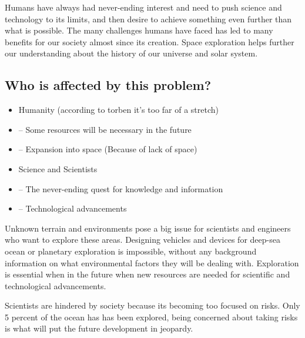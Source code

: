 Humans have always had never-ending interest and need to push science and technology to its limits, and then desire to achieve something even further than what is possible.  The many challenges humans have faced has led to many benefits for our society almost since its creation. Space exploration helps further our understanding about the history of our universe and solar system. %

\subsection{Who is affected by this problem?}
\begin{itemize}
	\item Humanity (according to torben it's too far of a stretch)
	\item -- Some resources will be necessary in the future
	\item -- Expansion into space (Because of lack of space)
	\item Science and Scientists
	\item -- The never-ending quest for knowledge and information
	\item -- Technological advancements
\end{itemize}

Unknown terrain and environments pose a big issue for scientists and engineers who want to explore these areas. Designing vehicles and devices for deep-sea ocean or planetary exploration is impossible, without any background information on what environmental factors they will be dealing with. Exploration is essential when in the future when new resources are needed for scientific and technological advancements.

Scientists are hindered by society because its becoming too focused on risks. Only 5 percent of the ocean has has been explored, being concerned about taking risks is what will put the future development in jeopardy. 
